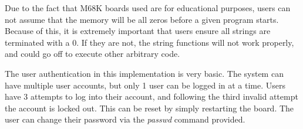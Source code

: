 \documentclass{article}
\begin{document}

Due to the fact that M68K boards used are for educational purposes, users can not assume that the memory will be all zeros before a given program starts. Because of this, it is extremely important that users ensure all strings are terminated with a 0. If they are not, the string functions will not work properly, and could go off to execute other arbitrary code.\\


The user authentication in this implementation is very basic. The system can have multiple user accounts, but only 1 user can be logged in at a time. Users have 3 attempts to log into their account, and following the third invalid attempt the account is locked out. This can be reset by simply restarting the board. The user can change their password via the \emph{passwd} command provided.
\end{document}
